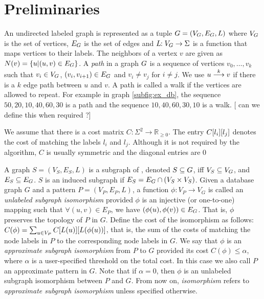 \section{Preliminaries}

An undirected labeled graph \db is represented as a tuple $ \db =
(\vg,\eg,L) $ where $\vg$ is the set of vertices, $\eg$ is the set of
edges and $L\!\!: \vg \rightarrow \Sigma $ is a function that maps
vertices to their labels.  The neighbors of a vertex $v$ are given as $
N(v) = \{ u | (u,v) \in \eg \} $.  A
{\em path} in a graph $\db$ is a sequence of vertices $v_0,\ldots,v_k$
such that $v_i \in \vg$, $(v_i,v_{i+1}) \in \eg$ and $v_i \neq v_j$ for
$i \neq j$.
We use $\kpath{u}{v}{k}$ if there is a $k$ edge path
between $u$ and $v$.
A path is called a walk if the vertices
are allowed to repeat. For example in graph \ref{subfig:ex_db}, the sequence
$50, 20, 10, 40, 60, 30$ is a path and the sequence $10, 40, 60, 30, 10$ is
a walk.
[ can we define this when required ?]

\smallskip{}
We assume that there is a cost matrix 
$C\!\!:\Sigma^{2} \rightarrow \mathbb{R}_{\geq 0} $. 
The entry $\matij{C}{l_i}{l_j}$
denotes the cost of matching the labels $l_i$ and $l_j$. Although it is 
not required by the algorithm, $C$ is usually symmetric and the diagonal
entries are $0$

\smallskip{}
A graph $S = (V_S,E_S,L)$ is a subgraph of \db, denoted $S \subseteq
\db$, iff $V_S \subseteq \vg$, and $E_S \subseteq \eg$.  $S$ is an
induced subgraph if $E_S = \eg \cap (V_S \times V_S)$.  Given a database
graph $G$ and a pattern $P = (V_P,E_P,L)$, a function $\phi\!\!: V_P \to
V_G$ is called an {\em unlabeled subgraph isomorphism} provided $\phi$
is an injective (or one-to-one) mapping such that $\forall (u,v) \in
E_P$, we have $(\phi(u),\phi(v)) \in \eg$. That is, $\phi$ preserves the
topology of $P$ in $G$. Define the cost of the isomorphism as follows:
$C(\phi) = \sum_{u \in \vp} \matij{C}{L(u)}{L(\phi(u))}$, that is, the
sum of the costs of matching the node labels in $P$ to the corresponding
node labels in $G$.  We say that $\phi$ is an {\em approximate subgraph
isomorphism} from $P$ to $G$ provided its cost $C(\phi) \le \alpha$,
where $\alpha$ is a user-specified threshold on the total cost. In this
case we also call $P$ an approximate pattern in $G$. Note
that if $\alpha = 0$, then $\phi$ is an unlabeled subgraph isomorphism
between $P$ and $G$. From now on, \textit{isomorphism}
refers to \textit{approximate subgraph isomorphism} unless specified
otherwise.


